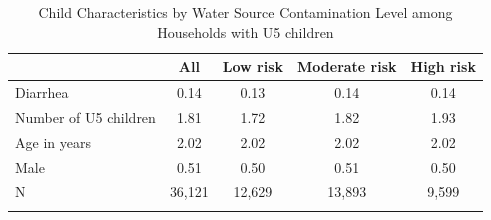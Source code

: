 \begin{table}[htbp]\centering
\def\sym#1{\ifmmode^{#1}\else\(^{#1}\)\fi}
\caption{Child Characteristics by Water Source Contamination Level among Households with U5 children \label{Desc2}}
\begin{tabular}{l*{4}{c}}
\hline\hline
                    &\multicolumn{1}{c}{All}&\multicolumn{1}{c}{Low risk}&\multicolumn{1}{c}{Moderate risk}&\multicolumn{1}{c}{High risk}\\
                    
\hline
Diarrhea            &        0.14&        0.13&        0.14&        0.14\\
Number of U5 children&        1.81&        1.72&        1.82&        1.93\\
Age in years        &        2.02&        2.02&        2.02&        2.02\\
Male                &        0.51&        0.50&        0.51&        0.50\\
\hline
N                   &      36,121&      12,629&      13,893&       9,599\\
\hline\hline
\multicolumn{5}{p{0.96\linewidth}}{\footnotesize }\\
\end{tabular}
\end{table}
